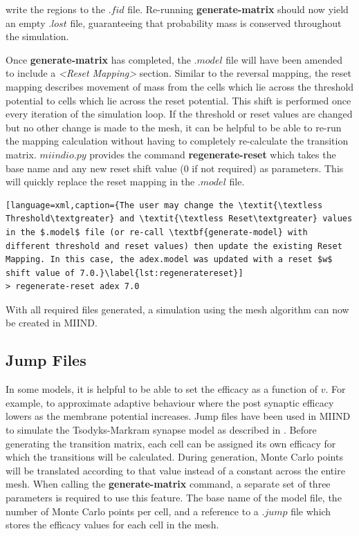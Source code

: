 \documentclass[utf8]{frontiersSCNS} %
\begin{document}
write the regions to the $.fid$ file. Re-running \textbf{generate-matrix} should now yield an empty $.lost$ file, guaranteeing that probability mass is conserved throughout the simulation.

Once \textbf{generate-matrix} has completed, the $.model$ file will have been amended to include a \textit{\textless Reset Mapping\textgreater} section. Similar to the reversal mapping, the reset mapping describes movement of mass from the cells which lie across the threshold potential to cells which lie across the reset potential. This shift is performed once every iteration of the simulation loop. If the threshold or reset values are changed but no other change is made to the mesh, it can be helpful to be able to re-run the mapping calculation without having to completely re-calculate the transition matrix. $miindio.py$ provides the command \textbf{regenerate-reset} which takes the base name and any new reset shift value (0 if not required) as parameters. This will quickly replace the reset mapping in the $.model$ file.

\begin{lstlisting}[language=xml,caption={The user may change the \textit{\textless Threshold\textgreater} and \textit{\textless Reset\textgreater} values in the $.model$ file (or re-call \textbf{generate-model} with different threshold and reset values) then update the existing Reset Mapping. In this case, the adex.model was updated with a reset $w$ shift value of 7.0.}\label{lst:regeneratereset}]
> regenerate-reset adex 7.0
\end{lstlisting}

With all required files generated, a simulation using the mesh algorithm can now be created in MIIND.\\

\subsection{Jump Files}
In some models, it is helpful to be able to set the efficacy as a function of $v$. For example, to approximate adaptive behaviour where the post synaptic efficacy lowers as the membrane potential increases. Jump files have been used in MIIND to simulate the Tsodyks-Markram \citep{tsodyks1997neural} synapse model as described in \cite{de2019computational}. Before generating the transition matrix, each cell can be assigned its own efficacy for which the transitions will be calculated. During generation, Monte Carlo points will be translated according to that value instead of a constant across the entire mesh. When calling the \textbf{generate-matrix} command, a separate set of three parameters is required to use this feature. The base name of the model file, the number of Monte Carlo points per cell, and a reference to a $.jump$ file which stores the efficacy values for each cell in the mesh. 
\end{document}
